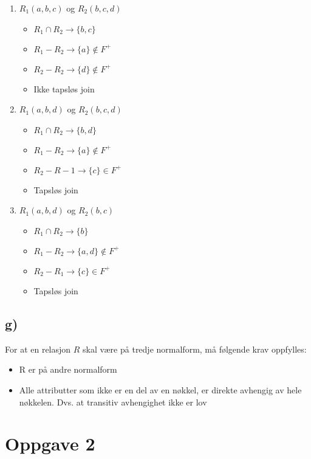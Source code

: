 \documentclass[a4paper, 12pt] {article}
\begin{document}
\begin{enumerate}
\item $R_1(a,b,c)$ og $R_2(b,c,d)$
    \begin{itemize}
        \item $R_1 \cap R_2 \rightarrow \{b,c\}$
        \item $R_1 - R_2 \rightarrow \{a\} \notin F^+$
        \item $R_2 - R_2 \rightarrow \{d\} \notin F^+$
        \item Ikke tapsløs join
    \end{itemize}
\item $R_1(a,b,d)$ og $R_2(b,c,d)$
    \begin{itemize}
        \item $R_1 \cap R_2 \rightarrow \{b,d\}$
        \item $R_1 - R_2 \rightarrow \{a\} \notin F^+$
        \item $R_2 - R-1 \rightarrow \{c\} \in F^+$
        \item Tapsløs join
    \end{itemize}
\item $R_1(a,b,d)$ og $R_2(b,c)$
    \begin{itemize}
    \item $R_1 \cap R_2 \rightarrow \{b\}$
    \item $R_1 - R_2 \rightarrow \{a,d\} \notin F^+$
    \item $R_2 - R_1 \rightarrow \{c\} \in F^+$
    \item Tapsløs join
    \end{itemize}
\end{enumerate}

\subsection{g)}

For at en relasjon $R$ skal være på tredje normalform, må følgende krav oppfylles:

\begin{itemize}
\item R er på andre normalform
\item Alle attributter som ikke er en del av en nøkkel, er direkte avhengig av hele nøkkelen. Dvs. at transitiv avhengighet ikke er lov
\end{itemize}

\section{Oppgave 2}
\end{document}
